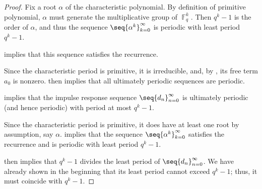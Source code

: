 \begin{proof}
   Fix a root \( \alpha \) of the characteristic polynomial. By definition of primitive polynomial, \( \alpha \) must generate the multiplicative group of \( \BbbF_q^k \). Then \( q^k - 1 \) is the order of \( \alpha \), and thus the sequence \( \seq{ \alpha^k }_{k=0}^\infty \) is periodic with least period \( q^k - 1 \).

   implies that this sequence satisfies the recurrence.

  Since the characteristic period is primitive, it is irreducible, and, by , its free term \( a_0 \) is nonzero.  then implies that all ultimately periodic sequences are periodic.

    implies that the impulse response sequence \( \seq{ d_n }_{n=0}^\infty \) is ultimately periodic (and hence periodic) with period at most \( q^k - 1 \).

  Since the characteristic period is primitive, it does have at least one root by assumption, say \( \alpha \).  implies that the sequence \( \seq{ \alpha^k }_{k=0}^\infty \) satisfies the recurrence and is periodic with least period \( q^k - 1 \).

   then implies that \( q^k - 1 \) divides the least period of \( \seq{ d_n }_{n=0}^\infty \). We have already shown in the beginning that its least period cannot exceed \( q^k - 1 \); thus, it must coincide with \( q^k - 1 \).
\end{proof}

